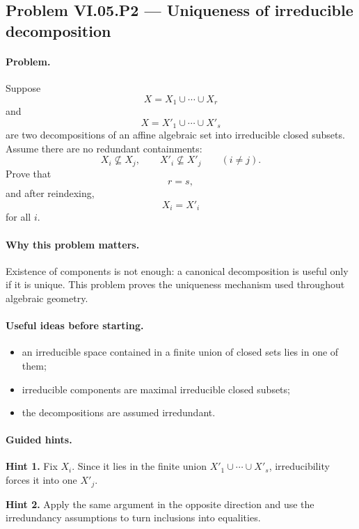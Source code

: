 \subsection*{Problem VI.05.P2 --- Uniqueness of irreducible decomposition}
\label{prob:vi-05-p2}

\paragraph{Problem.}
\label{prob:vi05-p2}
Suppose
\[
X=X_1\cup\cdots\cup X_r
\]
and
\[
X=X'_1\cup\cdots\cup X'_s
\]
are two decompositions of an affine algebraic set into irreducible closed subsets.  Assume
there are no redundant containments:
\[
X_i\not\subseteq X_j,
\qquad
X'_i\not\subseteq X'_j
\qquad(i\neq j).
\]
Prove that
\[
r=s,
\]
and after reindexing,
\[
X_i=X'_i
\]
for all \(i\).

\ifdefined\FullProblemDossiers

\paragraph{Why this problem matters.}
Existence of components is not enough: a canonical decomposition is useful only if it is
unique.  This problem proves the uniqueness mechanism used throughout algebraic geometry.

\paragraph{Useful ideas before starting.}
\begin{itemize}
\item an irreducible space contained in a finite union of closed sets lies in one of them;
\item irreducible components are maximal irreducible closed subsets;
\item the decompositions are assumed irredundant.
\end{itemize}

\paragraph{Guided hints.}
\textbf{Hint 1.} Fix \(X_i\).  Since it lies in the finite union
\(X'_1\cup\cdots\cup X'_s\), irreducibility forces it into one \(X'_j\).

\textbf{Hint 2.} Apply the same argument in the opposite direction and use the
irredundancy assumptions to turn inclusions into equalities.

